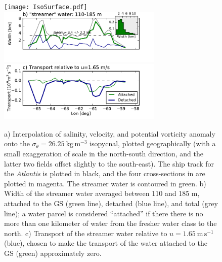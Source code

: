 \documentclass[draft,grl]{agutex2015}
\begin{document}
\begin{article}
\begin{figure}[htbp]
  \centering
    \texttt{[image: IsoSurface.pdf]}
\includegraphics[width=0.7\textwidth,trim=0 25 0 0, clip]{FrontWidth.pdf}
\includegraphics[width=0.7\textwidth]{FrontTransport.pdf}
  \caption{a) Interpolation of salinity, velocity, and potential vorticity anomaly onto the $\sigma_{\theta}=26.25\ \mathrm{kg\,m^{-3}}$ isopycnal, plotted geographically (with a small exaggeration of scale in the north-south direction, and the latter two fields offset slightly to the south-east).  The ship track for the \emph{Atlantis} is plotted in black, and the four cross-sections in  are plotted in magenta.  The streamer water is contoured in green.  b) Width of the streamer water averaged between 110 and 185 m, attached to the GS (green line), detached (blue line), and total (grey line); a water parcel is considered ``attached'' if there there is no more than one kilometer of water from the fresher water class to the north.  
  c) Transport of the streamer water relative to $u=1.65\ \mathrm{m\,s^{-1}}$  (blue), chosen to make the transport of the water attached to the GS (green) approximately zero.
  } \label{fig:IsoSurface}
\end{figure}


\end{article}
\end{document}
